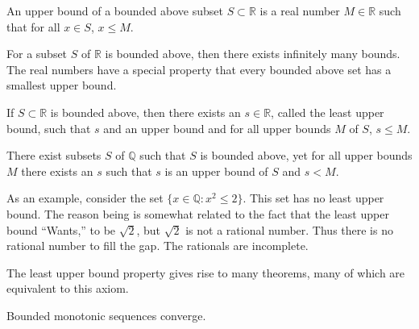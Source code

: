 \documentclass[crop=false,class=article,oneside]{standalone}
\begin{document}
            \begin{definition}
                An upper bound of a bounded above subset
                $S\subset\mathbb{R}$ is a real number $M\in\mathbb{R}$
                such that for all $x\in{S}$, $x\leq{M}$.
            \end{definition}
            For a subset $S$ of $\mathbb{R}$ is bounded above, then
            there exists infinitely many bounds. The real numbers
            have a special property that every bounded above set
            has a smallest upper bound.
            \begin{theorem}
                If $S\subset{\mathbb{R}}$ is bounded above, then
                there exists an $s\in\mathbb{R}$, called the least
                upper bound, such that $s$ and an upper bound
                and for all upper bounds $M$ of $S$, $s\leq{M}$.
            \end{theorem}
            \begin{theorem}
                There exist subsets $S$ of $\mathbb{Q}$ such that
                $S$ is bounded above, yet for all upper bounds
                $M$ there exists an $s$ such that $s$ is an upper
                bound of $S$ and $s<M$.
            \end{theorem}
            \begin{example}
                As an example, consider the set
                $\{x\in\mathbb{Q}:x^{2}\leq{2}\}$.
                This set has no least upper bound. The reason
                being is somewhat related to the fact that the
                least upper bound ``Wants,'' to be $\sqrt{2}$,
                but $\sqrt{2}$ is not a rational number. Thus
                there is no rational number to fill the gap.
                The rationals are incomplete.
            \end{example}
            The least upper bound property gives rise
            to many theorems, many of which are equivalent
            to this axiom.
            \begin{theorem}
                Bounded monotonic sequences converge.
            \end{theorem}
\end{document}
